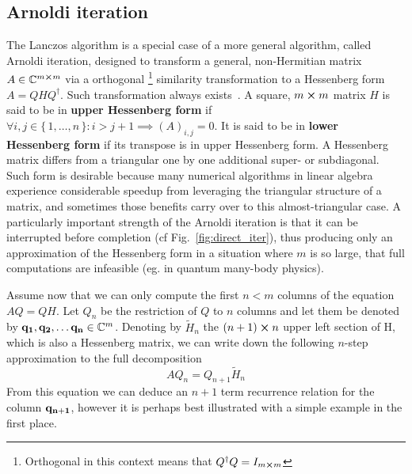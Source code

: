 \subsection{Arnoldi iteration}
The Lanczos algorithm is a special case of a more general algorithm, called Arnoldi iteration, designed to transform
a general, non-Hermitian matrix \(A\in \mathbb{C}^{m\cross m} \) via a orthogonal
\footnote{Orthogonal in this context means that \(Q^{\dagger}Q = I_{m \cross m}\)} similarity transformation to a Hessenberg form \(A = QHQ^{\dagger}\).
Such transformation always exists~\autocite {Garcia2017}. A square, \(m \cross m\) matrix \(H\) is said to be 
in \textbf{upper Hessenberg form} if \(\forall i,j\in \{\,1,\ldots,n\,\}: i > j+1 \implies (A)_{i,j}=0 \).
It is said to be in \textbf{lower Hessenberg form} if its transpose is in upper Hessenberg form.
A Hessenberg matrix differs from a triangular one by one additional super- or subdiagonal.
Such form is desirable because many numerical algorithms in linear algebra experience considerable speedup
from leveraging the triangular structure of a matrix, and sometimes those benefits carry over to this almost-triangular
case. A particularly important strength of the Arnoldi iteration is that it can be interrupted before completion (cf Fig.~\ref{fig:direct_iter}),
thus producing only an approximation of the Hessenberg form in a situation where \(m\) is so large, that
full computations are infeasible (eg. in quantum many-body physics).

Assume now that we can only compute the first \(n < m\) columns of the equation \(AQ=QH\).
Let \(Q_n\) be the restriction of \(Q\) to \(n\) columns and let them be denoted by \(\vectorbold{q_1},\vectorbold{q_2}, \ldots 
\vectorbold{ q_n}\in \CC^m\).
Denoting by \(\tilde{H}_n\) the \((n+1)\cross n\) upper left section of H, which is also a Hessenberg matrix, we can 
write down the following \(n\)-step approximation to the full decomposition
\begin{equation}
	AQ_{n}=Q_{n+1}\tilde{H}_{n}
	\label{eq:krylov_n_approx}
\end{equation}
From this equation we can deduce an \(n+1\) term recurrence relation for the column \(\vectorbold{q_{n+1}}\), however
it is perhaps best illustrated with a simple example in the first place.

